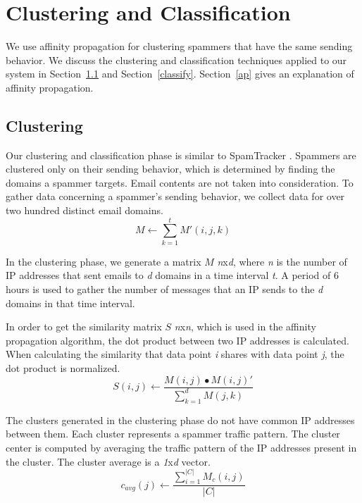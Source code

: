 \section{Clustering and Classification}
\label{cc} 
We use affinity propagation \cite{ap} for clustering spammers that have the same sending behavior. We discuss the clustering and classification techniques applied to our system in Section~\ref{cluster} and Section~\ref{classify}. Section~\ref{ap} gives an explanation of affinity propagation. 

\subsection{Clustering}
\label{cluster} 
Our clustering and classification phase is similar to SpamTracker \cite{bb}. Spammers are clustered only on their sending behavior, which is determined by finding the domains a spammer targets. Email contents are not taken into consideration. To gather data concerning a spammer's sending behavior, we collect data for over two hundred distinct email domains. 
\begin{equation}
       \displaystyle M \leftarrow \sum_{k = 1}^t M'(i, j, k)
       \label{eq:collapse}
\end{equation}

In the clustering phase, we generate a matrix $M$ \emph{n}x\emph{d}, where \emph{n} is the number of IP addresses that sent emails to \emph{d} domains in a time interval \emph{t}. A period of 6 hours is used to gather the number of messages that an IP sends to the \emph{d} domains in that time interval. 

In order to get the similarity matrix $S$ \emph{n}x\emph{n}, which is used in the affinity propagation algorithm, the dot product between two IP addresses is calculated. When
calculating the similarity that data point \emph{i} shares with data point \emph{j}, the dot product is normalized. 
\begin{equation}
	\displaystyle S(i, j) \leftarrow \frac{M(i, j) \bullet M(i, j)'}{\sum_{k=1}^d M(j,k)}
	\label{eq:similarity}
\end{equation}

The clusters generated in the clustering phase do not have common IP addresses between them. Each cluster represents a spammer traffic pattern. The cluster center is computed by averaging the traffic pattern of the IP addresses present in the cluster. The cluster average is a \emph{1}x\emph{d} vector.
\begin{equation}
	\displaystyle c_{avg}(j) \leftarrow \frac{\sum_{i=1}^{\vert C \vert} M_c(i,j)}{\vert C \vert}
	\label{eq:cavg}
\end{equation}

